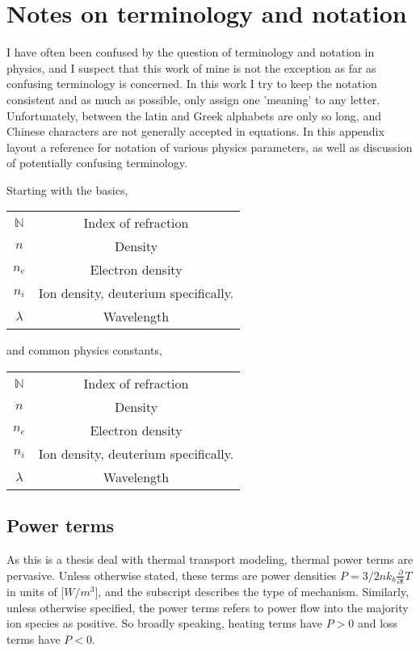 \chapter{Notes on terminology and notation}\label{app:term}
\begin{refsection}


I have often been confused by the question of terminology and notation in physics, and I suspect that this work of mine is not the exception as far as confusing terminology is concerned. In this work I try to keep the notation consistent and as much as possible, only assign one 'meaning' to any letter. Unfortunately, between the latin and Greek alphabets are only so long, and Chinese characters are not generally accepted in equations. In this appendix layout a reference for notation of various physics parameters, as well as discussion of potentially confusing terminology.

Starting with the basics,
\begin{center}\begin{tabular}{c|c}
     $\mathds{N}$ &  Index of refraction\\
     $n$ & Density \\
     $n_e$ & Electron density\\
     $n_i$ & Ion density, deuterium specifically.\\
     $\lambda$ & Wavelength
\end{tabular}\end{center}

and common physics constants,
\begin{center}\begin{tabular}{c|c}
     $\mathds{N}$ &  Index of refraction\\
     $n$ & Density \\
     $n_e$ & Electron density\\
     $n_i$ & Ion density, deuterium specifically.\\
     $\lambda$ & Wavelength
\end{tabular}\end{center}



\section{Power terms}\label{app_sec:power_terms}

As this is a thesis deal with thermal transport modeling, thermal power terms are pervasive. Unless otherwise stated, these terms are power densities $P = 3/2nk_b \frac{\partial}{\partial t}T$ in units of [$W/m^3$], and the subscript describes the type of mechanism. Similarly, unless otherwise specified, the power terms refers to power flow into the majority ion species as positive. So broadly speaking, heating terms have $P > 0$ and loss terms have $P < 0$.


\end{refsection}
